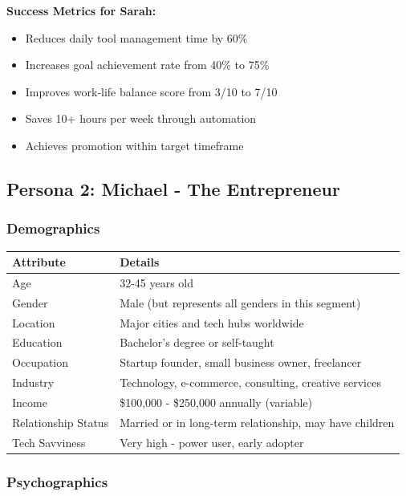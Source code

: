 \textbf{Success Metrics for Sarah:}

\begin{itemize}
    \item Reduces daily tool management time by 60\%
    \item Increases goal achievement rate from 40\% to 75\%
    \item Improves work-life balance score from 3/10 to 7/10
    \item Saves 10+ hours per week through automation
    \item Achieves promotion within target timeframe
\end{itemize}

\subsection{Persona 2: Michael - The Entrepreneur}

\subsubsection{Demographics}

\begin{table}[H]
\centering
\begin{tabular}{|l|p{10cm}|}
\hline
\rowcolor{lightgray}
\textbf{Attribute} & \textbf{Details} \\
\hline
Age & 32-45 years old \\
\hline
Gender & Male (but represents all genders in this segment) \\
\hline
Location & Major cities and tech hubs worldwide \\
\hline
Education & Bachelor's degree or self-taught \\
\hline
Occupation & Startup founder, small business owner, freelancer \\
\hline
Industry & Technology, e-commerce, consulting, creative services \\
\hline
Income & \$100,000 - \$250,000 annually (variable) \\
\hline
Relationship Status & Married or in long-term relationship, may have children \\
\hline
Tech Savviness & Very high - power user, early adopter \\
\hline
\end{tabular}
\end{table}

\subsubsection{Psychographics}

